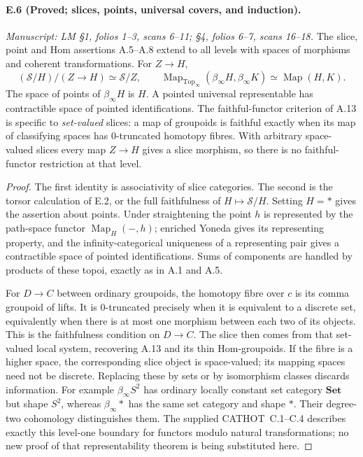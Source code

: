 \paragraph{E.6 (Proved; slices, points, universal covers, and induction).}
\textit{Manuscript: LM \S1, folios 1--3, scans 6--11; \S4, folios 6--7, scans 16--18.}
The slice, point and Hom assertions A.5--A.8 extend to all levels with spaces of morphisms and coherent transformations. For $Z\to H$,
\[
 (\mathcal S/H)/(Z\to H)\simeq\mathcal S/Z,
 \qquad
 \operatorname{Map}_{\mathrm{Top}_\infty}(\beta_\infty H,\beta_\infty K)
                         \simeq\operatorname{Map}(H,K).
                                                        \tag{E.6.1}
\]
The space of points of $\beta_\infty H$ is $H$. A pointed universal representable has contractible space of pointed identifications. The faithful-functor criterion of A.13 is specific to \emph{set-valued} slices: a map of groupoids is faithful exactly when its map of classifying spaces has $0$-truncated homotopy fibres. With arbitrary space-valued slices every map $Z\to H$ gives a slice morphism, so there is no faithful-functor restriction at that level.
\begin{proof}
The first identity is associativity of slice categories. The second is the torsor calculation of E.2, or the full faithfulness of $H\mapsto\mathcal S/H$. Setting $H=*$ gives the assertion about points. Under straightening the point $h$ is represented by the path-space functor $\operatorname{Map}_H(-,h)$; enriched Yoneda gives its representing property, and the infinity-categorical uniqueness of a representing pair gives a contractible space of pointed identifications. Sums of components are handled by products of these topoi, exactly as in A.1 and A.5.

For $D\to C$ between ordinary groupoids, the homotopy fibre over $c$ is its comma groupoid of lifts. It is $0$-truncated precisely when it is equivalent to a discrete set, equivalently when there is at most one morphism between each two of its objects. This is the faithfulness condition on $D\to C$. The slice then comes from that set-valued local system, recovering A.13 and its thin Hom-groupoids. If the fibre is a higher space, the corresponding slice object is space-valued; its mapping spaces need not be discrete. Replacing these by sets or by isomorphism classes discards information. For example $\beta_\infty S^2$ has ordinary locally constant set category $\mathbf{Set}$ but shape $S^2$, whereas $\beta_\infty *$ has the same set category and shape $*$. Their degree-two cohomology distinguishes them. The supplied CATHOT~C.1--C.4 describes exactly this level-one boundary for functors modulo natural transformations; no new proof of that representability theorem is being substituted here. 
\end{proof}

